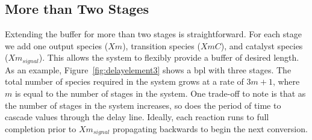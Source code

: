 \subsection{More than Two Stages}
Extending the buffer for more than two stages is straightforward. For each stage we add one output species ($Xm$), transition species ($XmC$), and catalyst species ($Xm_{signal}$). This allows the system to flexibly provide a buffer of desired length. As an example, Figure~\ref{fig:delayelement3} shows a \gls{bpl} with three stages. The total number of species required in the system grows at a rate of $3m+1$, where $m$ is equal to the number of stages in the system. One trade-off to note is that as the number of stages in the system increases, so does the period of time to cascade values through the delay line. Ideally, each reaction runs to full completion prior to $Xm_{signal}$ propagating backwards to begin the next conversion.

